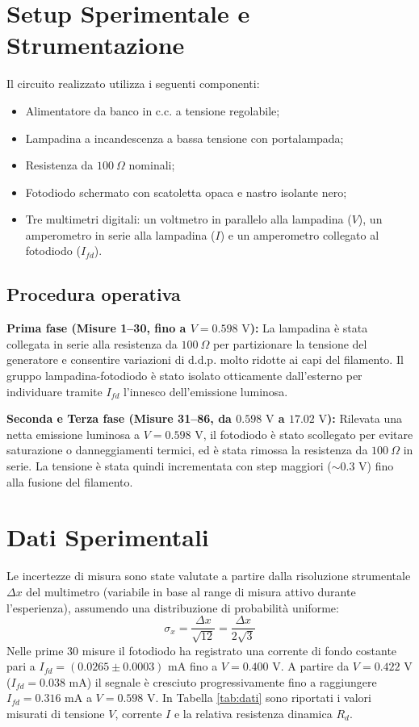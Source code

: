 \documentclass[a4paper,11pt]{article}
\begin{document}
\section{Setup Sperimentale e Strumentazione}
Il circuito realizzato utilizza i seguenti componenti:
\begin{itemize}
    \item Alimentatore da banco in c.c. a tensione regolabile;
    \item Lampadina a incandescenza a bassa tensione con portalampada;
    \item Resistenza da $100\ \Omega$ nominali;
    \item Fotodiodo schermato con scatoletta opaca e nastro isolante nero;
    \item Tre multimetri digitali: un voltmetro in parallelo alla lampadina ($V$), un amperometro in serie alla lampadina ($I$) e un amperometro collegato al fotodiodo ($I_{fd}$).
\end{itemize}

\subsection*{Procedura operativa}
\textbf{Prima fase (Misure 1--30, fino a $V = 0.598\text{ V}$):} La lampadina è stata collegata in serie alla resistenza da $100\ \Omega$ per partizionare la tensione del generatore e consentire variazioni di d.d.p. molto ridotte ai capi del filamento. Il gruppo lampadina-fotodiodo è stato isolato otticamente dall'esterno per individuare tramite $I_{fd}$ l'innesco dell'emissione luminosa.


\textbf{Seconda e Terza fase (Misure 31--86, da $0.598\text{ V}$ a $17.02\text{ V}$):} Rilevata una netta emissione luminosa a $V = 0.598\text{ V}$, il fotodiodo è stato scollegato per evitare saturazione o danneggiamenti termici, ed è stata rimossa la resistenza da $100\ \Omega$ in serie. La tensione è stata quindi incrementata con step maggiori ($\sim 0.3\text{ V}$) fino alla fusione del filamento.


\section{Dati Sperimentali}
Le incertezze di misura sono state valutate a partire dalla risoluzione strumentale $\Delta x$ del multimetro (variabile in base al range di misura attivo durante l'esperienza), assumendo una distribuzione di probabilità uniforme:
\begin{equation*}
    \sigma_x = \frac{\Delta x}{\sqrt{12}} = \frac{\Delta x}{2\sqrt{3}}
\end{equation*}
Nelle prime 30 misure il fotodiodo ha registrato una corrente di fondo costante pari a $I_{fd} = (0.0265 \pm 0.0003)\text{ mA}$ fino a $V = 0.400\text{ V}$. A partire da $V = 0.422\text{ V}$ ($I_{fd} = 0.038\text{ mA}$) il segnale è cresciuto progressivamente fino a raggiungere $I_{fd} = 0.316\text{ mA}$ a $V = 0.598\text{ V}$. In Tabella \ref{tab:dati} sono riportati i valori misurati di tensione $V$, corrente $I$ e la relativa resistenza dinamica $R_d$.
\end{document}
